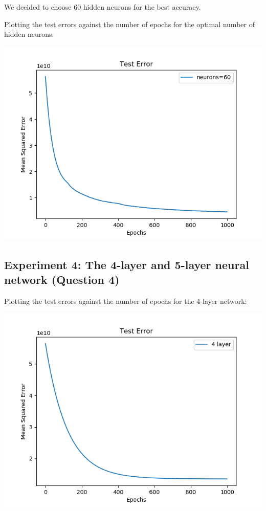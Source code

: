 We decided to choose 60 hidden neurons for the best accuracy.

Plotting the test errors against the number of epochs for the optimal
number of hidden neurons:

\begin{center}
    \includegraphics[width=\imgw]{images/p1b3_neuron_test.png}   
\end{center}

\subsection*{Experiment 4: The 4-layer and 5-layer neural network (Question 4)}

Plotting the test errors against the number of epochs for the 4-layer
network:

\begin{center}
    \includegraphics[width=\imgw]{images/p1b4_4layer_test.png}   
\end{center}

